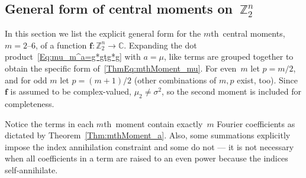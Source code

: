 \documentclass[letterpaper,11pt]{article}
\newcommand{\bs}[1]{{\boldsymbol{#1}}}
\newcommand{\gr}[1]{( #1 )}
\newcommand{\C}{\mathbb C}
\newcommand{\Int}{\mathbb Z}
\newcommand{\mth}{$m$th}
\theoremstyle{definition} \newtheorem{remark}{Remark}
\begin{document}
\subsection{General form of central moments on~$\Int_2^n$} \label{Sec:CentralMoments_Z2n}
In this section we list the explicit general form for the \mth\ central moments, $m=2\text{--}6$, of a function $\bs{f}:\Int_2^n\rightarrow\C$. Expanding the dot product~\eqref{Eq:mu_m^a=g*gtg*g} with $a=\mu$, like terms are grouped together to obtain the specific form of~\eqref{ThmEq:mthMoment_mu}. For even~$m$ let $p=m/2$, and for odd $m$ let $p=\gr{m+1}/2$ (other combinations of $m,p$ exist, too). Since~$\bs{f}$ is assumed to be complex-valued, $\mu_2 \neq \sigma^2$, so the second moment is included for completeness.

Notice the terms in each \mth\ moment contain exactly~$m$ Fourier coefficients as dictated by Theorem~\ref{Thm:mthMoment_a}. Also, some summations explicitly impose the index annihilation constraint and some do not --- it is not necessary when all coefficients in a term are raised to an even power because the indices self-annihilate.
\end{document}
